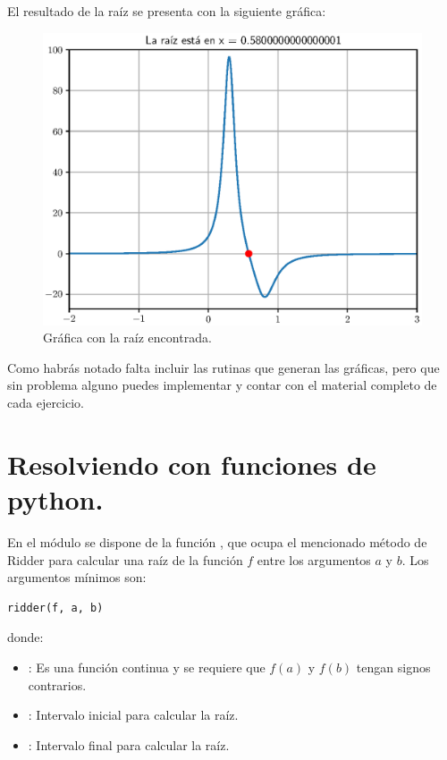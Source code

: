 El resultado de la raíz se presenta con la siguiente gráfica:
\begin{figure}[H]
    \centering
    \includegraphics[scale=0.75]{Imagenes/plot_Metodo_Ridder_Ejercicio_02_02.eps}
    \caption{Gráfica con la raíz encontrada.}
    \label{fig:figura_05}
\end{figure}
Como habrás notado falta incluir las rutinas que generan las gráficas, pero que sin problema alguno puedes implementar y contar con el material completo de cada ejercicio.

\section{Resolviendo con funciones de python.}

En el módulo  se dispone de la función , que ocupa el mencionado método de Ridder para calcular una raíz de la función $f$ entre los argumentos $a$ y $b$. Los argumentos mínimos son:
\begin{verbatim}
ridder(f, a, b)
\end{verbatim}
donde:
\begin{itemize}
\item {}: Es una función continua y se requiere que $f (a)$ y $f (b)$ tengan signos contrarios.
\item {}: Intervalo inicial para calcular la raíz.
\item {}: Intervalo final para calcular la raíz.
\end{itemize}

